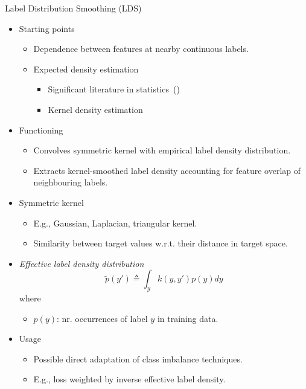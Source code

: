 \begin{frame}[shrink=3]{Label Distribution Smoothing (LDS)}
	\begin{itemize}\setlength\itemsep{.5em}
		\item<1-> Starting points
		\begin{itemize}
			\item Dependence between features at nearby continuous labels.
			\item Expected density estimation
			\begin{itemize}
				\item Significant literature in statistics~(\cite{parzen1962estimation})
				\item Kernel density estimation
			\end{itemize}
		\end{itemize}
		\item<2-> Functioning
		\begin{itemize}
			\item Convolves symmetric kernel with empirical label density distribution.
			\item Extracts kernel-smoothed label density accounting for feature overlap of neighbouring labels.
		\end{itemize}
		\item<3-> Symmetric kernel
		\begin{itemize}
			\item E.g., Gaussian, Laplacian, triangular kernel.
			\item Similarity between target values w.r.t. their distance in target space.
		\end{itemize}
		\item<4-> \emph{Effective label density distribution}
		\begin{equation*}
			\tilde{p}(y') \triangleq \int_\mathcal{Y} k(y,y')p(y)dy
		\end{equation*}
		where 
		\begin{itemize}
			\item $p(y)$: nr. occurrences of label $y$ in training data.
		\end{itemize}
		\item<5-> Usage
		\begin{itemize}
			\item Possible direct adaptation of class imbalance techniques.
			\item E.g., loss weighted by inverse effective label density.
		\end{itemize}
	\end{itemize}
\end{frame}